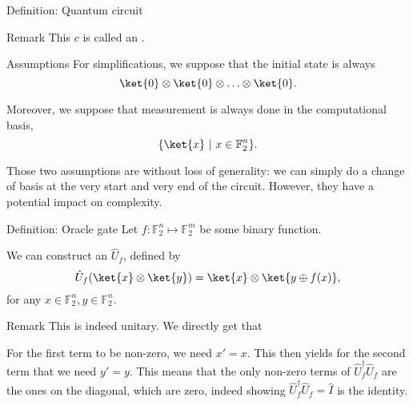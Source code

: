 \documentclass[a4paper]{article}
\begin{document}
\begin{parag}{Definition: Quantum circuit}
\begin{subparag}{Remark}
        This $c$ is called an .
    \end{subparag}

    \begin{subparag}{Assumptions}
        For simplifications, we suppose that the initial state is always 
        \[\ket{0} \otimes \ket{0} \otimes \ldots \otimes \ket{0}.\]
        
        Moreover, we suppose that measurement is always done in the computational basis, 
        \[\left\{\ket{x} \suchthat x \in \mathbb{F}_2^n\right\}.\]
        
        Those two assumptions are without loss of generality: we can simply do a change of basis at the very start and very end of the circuit. However, they have a potential impact on complexity.
    \end{subparag}
\end{parag}

\begin{parag}{Definition: Oracle gate}
    Let $f: \mathbb{F}_2^n \mapsto \mathbb{F}_{2}^m$ be some binary function. 

    We can construct an $\hat{U}_f$, defined by 
    \[\hat{U}_f \left(\ket{x} \otimes \ket{y}\right) = \ket{x} \otimes \ket{y \oplus f\left(x\right)},\]
    for any $x \in \mathbb{F}_2^n, y \in \mathbb{F}_2^n$.

    \begin{subparag}{Remark}
        This is indeed unitary. We directly get that 
        
        For the first term to be non-zero, we need $x' = x$. This then yields for the second term that we need $y' = y$. This means that the only non-zero terms of $\hat{U}_f^{\dagger} \hat{U}_f$ are the ones on the diagonal, which are zero, indeed showing $\hat{U}_f^{\dagger} \hat{U}_f = \hat{I}$ is the identity.
    \end{subparag}
\end{parag}
\end{document}
